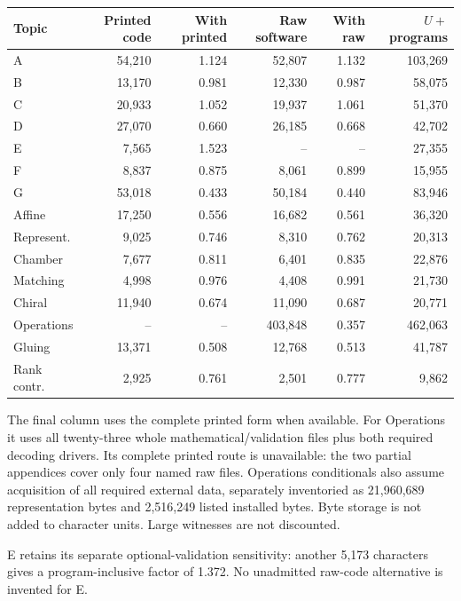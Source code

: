 \documentclass[11pt,a4paper]{article}
\newcommand{\tabsetup}{\small\setlength{\tabcolsep}{4pt}\renewcommand{\arraystretch}{1.10}}
\begin{document}
\begin{center}\tabsetup\begin{tabular}{lrrrrr}\toprule
Topic & Printed code & With printed & Raw software & With raw & $U+$programs\\\midrule
A & 54,210 & 1.124 & 52,807 & 1.132 & 103,269 \\
B & 13,170 & 0.981 & 12,330 & 0.987 & 58,075 \\
C & 20,933 & 1.052 & 19,937 & 1.061 & 51,370 \\
D & 27,070 & 0.660 & 26,185 & 0.668 & 42,702 \\
E & 7,565 & 1.523 & -- & -- & 27,355 \\
F & 8,837 & 0.875 & 8,061 & 0.899 & 15,955 \\
G & 53,018 & 0.433 & 50,184 & 0.440 & 83,946 \\
Affine & 17,250 & 0.556 & 16,682 & 0.561 & 36,320 \\
Represent. & 9,025 & 0.746 & 8,310 & 0.762 & 20,313 \\
Chamber & 7,677 & 0.811 & 6,401 & 0.835 & 22,876 \\
Matching & 4,998 & 0.976 & 4,408 & 0.991 & 21,730 \\
Chiral & 11,940 & 0.674 & 11,090 & 0.687 & 20,771 \\
Operations & -- & -- & 403,848 & 0.357 & 462,063 \\
Gluing & 13,371 & 0.508 & 12,768 & 0.513 & 41,787 \\
Rank contr. & 2,925 & 0.761 & 2,501 & 0.777 & 9,862 \\
\bottomrule\end{tabular}\end{center}
The final column uses the complete printed form when available. For Operations it uses all twenty-three whole mathematical/validation files plus both required decoding drivers. Its complete printed route is unavailable: the two partial appendices cover only four named raw files. Operations conditionals also assume acquisition of all required external data, separately inventoried as 21,960,689 representation bytes and 2,516,249 listed installed bytes. Byte storage is not added to character units. Large witnesses are not discounted.

E retains its separate optional-validation sensitivity: another 5,173 characters gives a program-inclusive factor of 1.372. No unadmitted raw-code alternative is invented for E.
\end{document}
